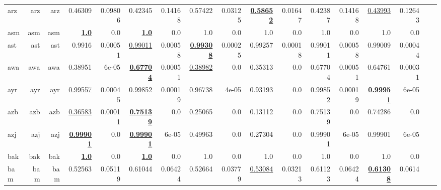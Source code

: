 \documentclass[11pt]{article}
\begin{document}
\begin{table*}[h]
{\begin{tabular}{lrrrrrrrrrrrrrrrr}
arz         & arz         & arz         & 0.46309         & 0.09806         & 0.42345         & 0.14168         & 0.57422         & 0.03125         & \textbf{\underline{0.58652}}         & 0.01647         & 0.42387         & 0.14168         & \underline{0.43993}         & 0.12643         \\
asm         & asm         & asm         & \textbf{\underline{1.0}}         & 0.0         & \textbf{\underline{1.0}}         & 0.0         & 1.0         & 0.0         & 1.0         & 0.0         & 1.0         & 0.0         & 1.0         & 0.0         \\
ast         & ast         & ast         & 0.9916         & 0.00051         & \underline{0.99011}         & 0.00058         & \textbf{\underline{0.99308}}         & 0.00025         & 0.99257         & 0.00018         & 0.99011         & 0.00058         & 0.99009         & 0.00044         \\
awa         & awa         & awa         & 0.38951         & 6e-05         & \textbf{\underline{0.67704}}         & 0.00051         & \underline{0.38982}         & 0.0         & 0.35313         & 0.0         & 0.67704         & 0.00051         & 0.64761         & 0.00031         \\
ayr         & ayr         & ayr         & \underline{0.99557}         & 0.00045         & 0.99852         & 0.00019         & 0.96738         & 4e-05         & 0.93193         & 0.0         & 0.99852         & 0.00019         & \textbf{\underline{0.99951}}         & 6e-05         \\
azb         & azb         & azb         & \underline{0.36583}         & 0.00011         & \textbf{\underline{0.75139}}         & 0.0         & 0.25065         & 0.0         & 0.13112         & 0.0         & 0.75139         & 0.0         & 0.74286         & 0.0         \\
azj         & azj         & azj         & \textbf{\underline{0.99901}}         & 0.0         & \textbf{\underline{0.99901}}         & 6e-05         & 0.49963         & 0.0         & 0.27304         & 0.0         & 0.99901         & 6e-05         & 0.99901         & 6e-05         \\
bak         & bak         & bak         & \textbf{\underline{1.0}}         & 0.0         & \textbf{\underline{1.0}}         & 0.0         & 1.0         & 0.0         & 1.0         & 0.0         & 1.0         & 0.0         & 1.0         & 0.0         \\
bam         & bam         & bam         & 0.52563         & 0.05119         & 0.61044         & 0.06424         & 0.52664         & 0.03779         & \underline{0.53084}         & 0.03213         & 0.61123         & 0.06424         & \textbf{\underline{0.61308}}         & 0.0614         \\

\end{tabular}}
\end{table*}
\end{document}
